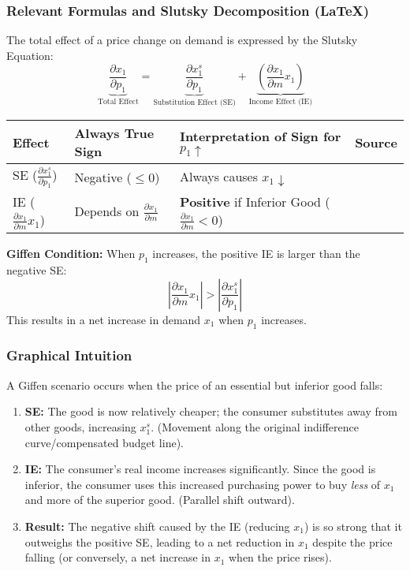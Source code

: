 \documentclass{article}
\begin{document}
\subsubsection*{Relevant Formulas and Slutsky Decomposition (LaTeX)}
The total effect of a price change on demand is expressed by the Slutsky Equation: 
$$\underbrace{\frac{\partial x_1}{\partial p_1}}_{\text{Total Effect}} = \underbrace{\frac{\partial x_1^s}{\partial p_1}}_{\text{Substitution Effect (SE)}} + \underbrace{\left(\frac{\partial x_1}{\partial m} x_1\right)}_{\text{Income Effect (IE)}}$$

\begin{center}
\begin{tabular}{llll}
\toprule
\textbf{Effect} & \textbf{Always True Sign} & \textbf{Interpretation of Sign for $p_1 \uparrow$} & \textbf{Source} \\
\midrule
SE ($\frac{\partial x_1^s}{\partial p_1}$) & Negative ($\leq 0$) & Always causes $x_1 \downarrow$ & \\
IE ($\frac{\partial x_1}{\partial m} x_1$) & Depends on $\frac{\partial x_1}{\partial m}$ & \textbf{Positive} if Inferior Good ($\frac{\partial x_1}{\partial m} < 0$) & \\
\bottomrule
\end{tabular}
\end{center}

\textbf{Giffen Condition:} When $p_1$ increases, the positive IE is larger than the negative SE: 
$$\left| \frac{\partial x_1}{\partial m} x_1 \right| > \left| \frac{\partial x_1^s}{\partial p_1} \right|$$
This results in a net increase in demand $x_1$ when $p_1$ increases.

\subsubsection*{Graphical Intuition}
A Giffen scenario occurs when the price of an essential but inferior good falls:
\begin{enumerate}
    \item \textbf{SE:} The good is now relatively cheaper; the consumer substitutes away from other goods, increasing $x_1^s$. (Movement along the original indifference curve/compensated budget line).
    \item \textbf{IE:} The consumer's real income increases significantly. Since the good is inferior, the consumer uses this increased purchasing power to buy \textit{less} of $x_1$ and more of the superior good. (Parallel shift outward).
    \item \textbf{Result:} The negative shift caused by the IE (reducing $x_1$) is so strong that it outweighs the positive SE, leading to a net reduction in $x_1$ despite the price falling (or conversely, a net increase in $x_1$ when the price rises).
\end{enumerate}
\end{document}
